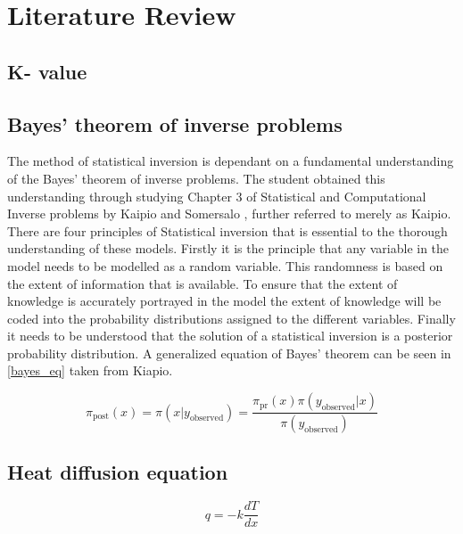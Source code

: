 \section{Literature Review}
	\subsection{K- value}
%	
	
	\subsection{Bayes' theorem of inverse problems}
	The method of statistical inversion is dependant on a fundamental understanding of the Bayes' theorem of inverse problems. 
	The student obtained this understanding through studying Chapter 3 of Statistical and Computational Inverse problems by Kaipio and Somersalo \citet{Kaipo:2005}, further referred to merely as Kaipio. 
	There are four principles of Statistical inversion that is essential to the thorough understanding of these models. 
	Firstly it is the principle that any variable in the model needs to be modelled as a random variable. 
	This randomness is based on the extent of information that is available. 
	To ensure that the extent of knowledge is accurately portrayed in the model the extent of knowledge will be coded into the probability distributions assigned to the different variables. 
	Finally it needs to be understood that the solution of a statistical inversion is a posterior probability distribution.
	A generalized equation of Bayes' theorem can be seen in \ref{bayes_eq} taken from Kiapio. 
	
	\begin{equation}
	\label{bayes_eq}
	\pi_{\text{post}}(x) = \pi(x|y_{\text{observed}}) = \frac{\pi_{\text{pr}}(x) \pi(y_{\text{observed}}|x)}{\pi (y_{\text{observed}})}	
	\end{equation}
	\subsection{Heat diffusion equation}
	\begin{equation}
	\label{heat_eq}
		q = -k \frac{dT}{dx}
	\end{equation}
